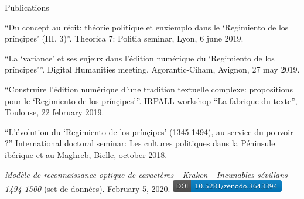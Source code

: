 \begin{rubric}{Publications}
                    
                
                    
                    \entry*
                
                    
                    \entry*
                
                    
                    \entry*
                
                    
                    \entry*
                \enquote{Du concept au récit: théorie politique et
                        enxiemplo dans le \enquote{Regimiento de los
                        prínçipes} (III, 3)}. Theorica 7: Politia
                        seminar, Lyon, 6 june 2019.
                    
                    \entry*
                \enquote{La \enquote{variance} et ses enjeux dans
                        l'édition numérique du \enquote{Regimiento de los
                        príncipes}}. Digital Humanities meeting,
                        Agorantic-Ciham, Avignon, 27 may
                        2019.
                    
                    \entry*
                \enquote{Construire l'édition numérique d'une
                        tradition textuelle complexe: propositions pour le
                        \enquote{Regimiento de los prínçipes}}.
                        IRPALL workshop \enquote{La fabrique du texte},
                        Toulouse, 22 february 2019.
                    
                    \entry*
                \enquote{L'évolution du \enquote{Regimiento de los
                        prínçipes} (1345-1494), au service du pouvoir
                        ?} International doctoral seminar: \href{https://recherche.univ-pau.fr/fr/accueil/cpim.html}{Les cultures politiques dans la Péninsule ibérique et
                        au Maghreb}, Bielle, october 2018.
                    
            
                    
                    \entry*
                
                    
                    \entry*
                \textit{Modèle de reconnaissance optique de
                        caractères - Kraken - Incunables sévillans
                        1494-1500} (set de données). February 5, 2020.
                        \href{https://zenodo.org/record/3643393}{\includegraphics[scale=0.55]{img/kraken_doi.png}}\end{rubric}


